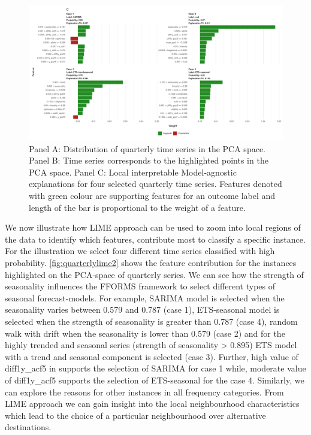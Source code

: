 \documentclass[11pt,a4paper,]{article}
\begin{document}
\begin{figure}[h]

{\centering \includegraphics{figures/quarterlylime2-1} 

}

\caption{Panel A: Distribution of quarterly time series in the PCA space. Panel B: Time series corresponds to the highlighted points in the PCA space. Panel C: Local interpretable Model-agnostic explanations for four selected quarterly time series. Features denoted with green colour are supporting features for an outcome label and length of the bar is proportional to the weight of a feature.}\label{fig:quarterlylime2}
\end{figure}

We now illustrate how LIME approach can be used to zoom into local
regions of the data to identify which features, contribute most to
classify a specific instance. For the illustration we select four
different time series classified with high probability.
\autoref{fig:quarterlylime2} shows the feature contribution for the
instances highlighted on the PCA-space of quarterly series. We can see
how the strength of seasonality influences the FFORMS framework to
select different types of seasonal forecast-models. For example, SARIMA
model is selected when the seasonality varies between 0.579 and 0.787
(case 1), ETS-seasonal model is selected when the strength of
seasonality is greater than 0.787 (case 4), random walk with drift when
the seasonality is lower than 0.579 (case 2) and for the highly trended
and seasonal series (strength of seasonality \textgreater{} 0.895) ETS
model with a trend and seasonal component is selected (case 3). Further,
high value of diff1y\_acf5 in supports the selection of SARIMA for case
1 while, moderate value of diff1y\_acf5 supports the selection of
ETS-seasonal for the case 4. Similarly, we can explore the reasons for
other instances in all frequency categories. From LIME approach we can
gain insight into the local neighbourhood characteristics which lead to
the choice of a particular neighbourhood over alternative destinations.
\end{document}
